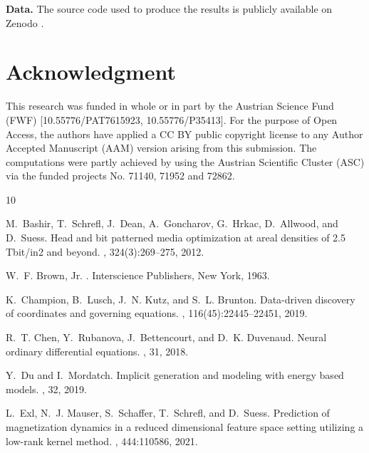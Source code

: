 \documentclass[a4paper,11pt]{article}
\begin{document}
\begin{table}[ht]
\begin{table}[ht]
\textbf{Data.} The source code used to produce the results is publicly available on Zenodo \cite{ebm_2026_22281255}.

\newpage

\section*{Acknowledgment} 
This research was funded in whole or in part by the Austrian Science Fund (FWF) [10.55776/PAT7615923, 10.55776/P35413]. For the purpose of Open Access, the authors have applied a CC BY public copyright license to any Author Accepted Manuscript (AAM) version arising from this submission. The computations were partly achieved by using the Austrian Scientific Cluster (ASC) via the funded projects No. 71140, 71952 and 72862.

%
%

\begin{thebibliography}{10}

M.~Bashir, T.~Schrefl, J.~Dean, A.~Goncharov, G.~Hrkac, D.~Allwood, and D.~Suess.
\newblock Head and bit patterned media optimization at areal densities of 2.5 {T}bit/in2 and beyond.
, 324(3):269--275, 2012.

W.~F. Brown, Jr.
.
\newblock Interscience Publishers, New York, 1963.

K.~Champion, B.~Lusch, J.~N. Kutz, and S.~L. Brunton.
\newblock Data-driven discovery of coordinates and governing equations.
, 116(45):22445--22451, 2019.

R.~T. Chen, Y.~Rubanova, J.~Bettencourt, and D.~K. Duvenaud.
\newblock Neural ordinary differential equations.
, 31, 2018.

Y.~Du and I.~Mordatch.
\newblock Implicit generation and modeling with energy based models.
, 32, 2019.

L.~Exl, N.~J. Mauser, S.~Schaffer, T.~Schrefl, and D.~Suess.
\newblock Prediction of magnetization dynamics in a reduced dimensional feature space setting utilizing a low-rank kernel method.
, 444:110586, 2021.


\end{thebibliography}
\end{table}
\end{table}
\end{document}
